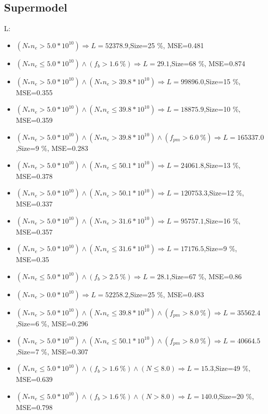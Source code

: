 \documentclass[numbered]{CSL}
\begin{document}
\subsection{Supermodel}
L:
\begin{itemize}
\item $(N_* n_e > 5.0 * 10^{10}) \Rightarrow L = 52378.9$,\hfill Size=25 \%, MSE=0.481
\item $(N_* n_e \leq 5.0 * 10^{10}) \land (f_b > 1.6~\%) \Rightarrow L = 29.1$,\hfill Size=68 \%, MSE=0.874
\item $(N_* n_e > 5.0 * 10^{10}) \land (N_* n_e > 39.8 * 10^{10}) \Rightarrow L = 99896.0$,\hfill Size=15 \%, MSE=0.355
\item $(N_* n_e > 5.0 * 10^{10}) \land (N_* n_e \leq 39.8 * 10^{10}) \Rightarrow L = 18875.9$,\hfill Size=10 \%, MSE=0.359
\item $(N_* n_e > 5.0 * 10^{10}) \land (N_* n_e > 39.8 * 10^{10}) \land (f_{pm} > 6.0~\%) \Rightarrow L = 165337.0$,\hfill Size=9 \%, MSE=0.283
\item $(N_* n_e > 5.0 * 10^{10}) \land (N_* n_e \leq 50.1 * 10^{10}) \Rightarrow L = 24061.8$,\hfill Size=13 \%, MSE=0.378
\item $(N_* n_e > 5.0 * 10^{10}) \land (N_* n_e > 50.1 * 10^{10}) \Rightarrow L = 120753.3$,\hfill Size=12 \%, MSE=0.337
\item $(N_* n_e > 5.0 * 10^{10}) \land (N_* n_e > 31.6 * 10^{10}) \Rightarrow L = 95757.1$,\hfill Size=16 \%, MSE=0.357
\item $(N_* n_e > 5.0 * 10^{10}) \land (N_* n_e \leq 31.6 * 10^{10}) \Rightarrow L = 17176.5$,\hfill Size=9 \%, MSE=0.35
\item $(N_* n_e \leq 5.0 * 10^{10}) \land (f_b > 2.5~\%) \Rightarrow L = 28.1$,\hfill Size=67 \%, MSE=0.86
\item $(N_* n_e > 0.0 * 10^{10}) \Rightarrow L = 52258.2$,\hfill Size=25 \%, MSE=0.483
\item $(N_* n_e > 5.0 * 10^{10}) \land (N_* n_e \leq 39.8 * 10^{10}) \land (f_{pm} > 8.0~\%) \Rightarrow L = 35562.4$,\hfill Size=6 \%, MSE=0.296
\item $(N_* n_e > 5.0 * 10^{10}) \land (N_* n_e \leq 50.1 * 10^{10}) \land (f_{pm} > 8.0~\%) \Rightarrow L = 40664.5$,\hfill Size=7 \%, MSE=0.307
\item $(N_* n_e \leq 5.0 * 10^{10}) \land (f_b > 1.6~\%) \land (N \leq 8.0) \Rightarrow L = 15.3$,\hfill Size=49 \%, MSE=0.639
\item $(N_* n_e \leq 5.0 * 10^{10}) \land (f_b > 1.6~\%) \land (N > 8.0) \Rightarrow L = 140.0$,\hfill Size=20 \%, MSE=0.798

\end{itemize}
\end{document}

